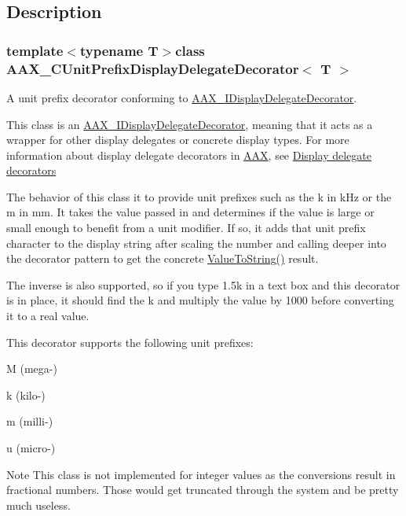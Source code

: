 \subsection{Description}
\subsubsection*{template$<$typename T$>$class A\+A\+X\+\_\+\+C\+Unit\+Prefix\+Display\+Delegate\+Decorator$<$ T $>$}

A unit prefix decorator conforming to \hyperlink{a00094}{A\+A\+X\+\_\+\+I\+Display\+Delegate\+Decorator}. 

This class is an \hyperlink{a00094}{A\+A\+X\+\_\+\+I\+Display\+Delegate\+Decorator}, meaning that it acts as a wrapper for other display delegates or concrete display types. For more information about display delegate decorators in \hyperlink{a00288}{A\+A\+X}, see \hyperlink{a00346_displaydelegates_decorators}{Display delegate decorators}

The behavior of this class it to provide unit prefixes such as the k in k\+Hz or the m in mm. It takes the value passed in and determines if the value is large or small enough to benefit from a unit modifier. If so, it adds that unit prefix character to the display string after scaling the number and calling deeper into the decorator pattern to get the concrete \hyperlink{a00046_a74d63ddd342455674e9b1b00dc0f76e2}{Value\+To\+String()} result.

The inverse is also supported, so if you type 1.\+5k in a text box and this decorator is in place, it should find the k and multiply the value by 1000 before converting it to a real value.

This decorator supports the following unit prefixes\+: \begin{DoxyItemize}
\item M (mega-\/) \item k (kilo-\/) \item m (milli-\/) \item u (micro-\/)\end{DoxyItemize}
\begin{DoxyNote}{Note}
This class is not implemented for integer values as the conversions result in fractional numbers. Those would get truncated through the system and be pretty much useless. 
\end{DoxyNote}
